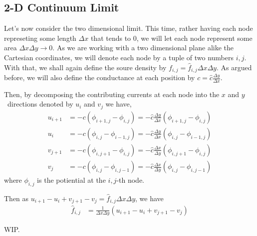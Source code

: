 \documentclass[]{article}
\begin{document}
\subsection{2-D Continuum Limit}\label{d-continuum-limit-1}

Let's now consider the two dimensional limit. This time, rather having
each node represeting some length \(\Delta x\) that tends to 0, we will
let each node represent some area \(\Delta x \Delta y \to 0\). As we are
working with a two dimensional plane alike the Cartesian coordinates, we
will denote each node by a tuple of two numbers \(i,j\). With that, we
shall again define the soure density by
\(f_{i,j} = \hat{f}_{i,j} \Delta x \Delta y\). As argued before, we will
also define the conductance at each position by
\(c = \hat{c} \frac{\Delta y}{\Delta x}\).

Then, by decomposing the contributing currents at each node into the
\(x\) and \(y\)~directions denoted by \(u_i\) and \(v_j\) we have, \[
\begin{split}
u_{i+1} & = -c(\phi_{i+1, j}- \phi_{i,j}) = -\hat{c}\frac{\Delta y}{\Delta x}(\phi_{i+1, j}- \phi_{i,j})\\
u_{i} & = -c(\phi_{i, j}- \phi_{i-1,j}) = -\hat{c}\frac{\Delta y}{\Delta x}(\phi_{i, j}- \phi_{i-1,j})\\
v_{j+1} & = -c(\phi_{i, j+1}- \phi_{i,j}) = -\hat{c}\frac{\Delta x}{\Delta y}(\phi_{i, j+1}- \phi_{i,j})\\
v_{j} & = -c(\phi_{i, j}- \phi_{i,j-1}) = -\hat{c}\frac{\Delta x}{\Delta y}(\phi_{i, j}- \phi_{i,j-1})
\end{split}
\] where \(\phi_{i,j}\) is the potiential at the \(i,j\)-th node.

Then as
\(u_{i+1} - u_{i} + v_{j+1} - v_{j} = \hat{f}_{i,j} \Delta x \Delta y\),
we have \[
\begin{split}
\hat{f}_{i,j} & = \frac{1}{\Delta x \Delta y}(u_{i+1} - u_{i} + v_{j+1} - v_{j})
\end{split}
\]

WIP.
\end{document}
